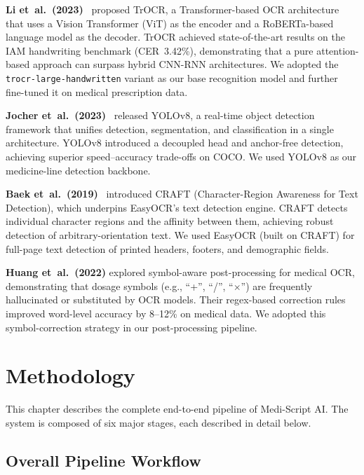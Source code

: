 \documentclass[12pt,a4paper,oneside]{report}
\begin{document}
\textbf{Li et~al.\ (2023)}~\cite{li2023trocr} proposed TrOCR, a Transformer-based OCR architecture that uses a Vision Transformer (ViT) as the encoder and a RoBERTa-based language model as the decoder. TrOCR achieved state-of-the-art results on the IAM handwriting benchmark (CER~3.42\%), demonstrating that a pure attention-based approach can surpass hybrid CNN-RNN architectures. We adopted the \texttt{trocr-large-handwritten} variant as our base recognition model and further fine-tuned it on medical prescription data.

\textbf{Jocher et~al.\ (2023)}~\cite{jocher2023yolov8} released YOLOv8, a real-time object detection framework that unifies detection, segmentation, and classification in a single architecture. YOLOv8 introduced a decoupled head and anchor-free detection, achieving superior speed--accuracy trade-offs on COCO. We used YOLOv8 as our medicine-line detection backbone.

\textbf{Baek et~al.\ (2019)}~\cite{baek2019craft} introduced CRAFT (Character-Region Awareness for Text Detection), which underpins EasyOCR's text detection engine. CRAFT detects individual character regions and the affinity between them, achieving robust detection of arbitrary-orientation text. We used EasyOCR (built on CRAFT) for full-page text detection of printed headers, footers, and demographic fields.

\textbf{Huang et~al.\ (2022)} explored symbol-aware post-processing for medical OCR, demonstrating that dosage symbols (e.g., ``+'', ``/'', ``$\times$'') are frequently hallucinated or substituted by OCR models. Their regex-based correction rules improved word-level accuracy by 8--12\% on medical data. We adopted this symbol-correction strategy in our post-processing pipeline.


\chapter{Methodology}

This chapter describes the complete end-to-end pipeline of Medi-Script AI. The system is composed of six major stages, each described in detail below.

\section{Overall Pipeline Workflow}
\end{document}
